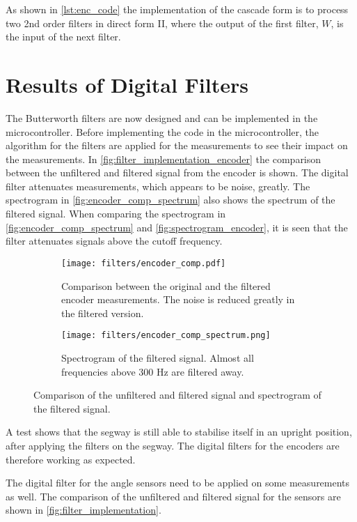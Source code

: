 As shown in \autoref{lst:enc_code} the implementation of the cascade form is to process two 2nd order filters in direct form II, where the output of the first filter, $W$, is the input of the next filter.

\section{Results of Digital Filters}
The Butterworth filters are now designed and can be implemented in the microcontroller. Before implementing the code in the microcontroller, the algorithm for the filters are applied for the measurements to see their impact on the measurements. In \autoref{fig:filter_implementation_encoder} the comparison between the unfiltered and filtered signal from the encoder is shown. The digital filter attenuates measurements, which appears to be noise, greatly. The spectrogram in \autoref{fig:encoder_comp_spectrum} also shows the spectrum of the filtered signal. When comparing the spectrogram in \autoref{fig:encoder_comp_spectrum} and \autoref{fig:spectrogram_encoder}, it is seen that the filter attenuates signals above the cutoff frequency.  

\begin{figure}[H]
\centering
\begin{subfigure}[b]{0.85\textwidth}
\hspace*{-0.8cm} 
    \texttt{[image: filters/encoder\_comp.pdf]}
    \caption{Comparison between the original and the filtered encoder measurements. The noise is reduced greatly in the filtered version.}
    \label{fig:filter_implementation_encoder}
\end{subfigure}    
\begin{subfigure}[b]{0.9\textwidth}
    \texttt{[image: filters/encoder\_comp\_spectrum.png]}
    \caption{Spectrogram of the filtered signal. Almost all frequencies above 300 Hz are filtered away.}
    \label{fig:encoder_comp_spectrum}
\end{subfigure}   
\caption{Comparison of the unfiltered and filtered signal and spectrogram of the filtered signal.}
\end{figure}

A test shows that the segway is still able to stabilise itself in an upright position, after applying the filters on the segway. The digital filters for the encoders are therefore working as expected.

The digital filter for the angle sensors need to be applied on some measurements as well. The comparison of the unfiltered and filtered signal for the sensors are shown in \autoref{fig:filter_implementation}. 

